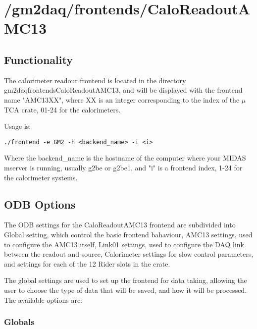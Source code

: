 \section{/gm2daq/frontends/CaloReadoutAMC13}

\subsection{Functionality}

The calorimeter readout frontend is located in the directory gm2daq\/frontends\/CaloReadoutAMC13, and will be displayed with the frontend name "AMC13XX", where XX is an integer corresponding to the index of the $\mu$TCA crate, 01-24 for the calorimeters. 

Usage is:

\begin{verbatim}
./frontend -e GM2 -h <backend_name> -i <i>
\end{verbatim}

Where the backend\_name is the hostname of the computer where your MIDAS mserver is running, usually g2be or g2be1, and "i" is a frontend index, 1-24 for the calorimeter systems.

\subsection{ODB Options}

The ODB settings for the CaloReadoutAMC13 frontend are subdivided into Global setting, which control the basic frontend bahaviour, AMC13 settings, used to configure the AMC13 itself, Link01 settings, used to configure the DAQ link between the readout and source, Calorimeter settings for slow control parameters, and settings for each of the 12 Rider slots in the crate.

The global settings are used to set up the frontend for data taking, allowing the user to choose the type of data that will be saved, and how it will be processed. The available options are:

\subsubsection{Globals}


